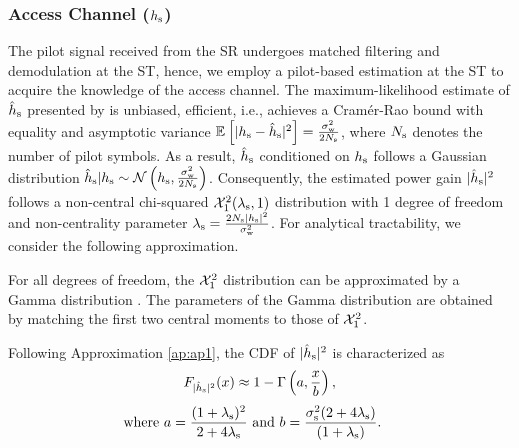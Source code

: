 \subsubsection*{Access Channel ($h_{\text{s}}$)}
The pilot signal received from the SR undergoes matched filtering and demodulation at the ST, hence, we employ a pilot-based estimation at the ST to acquire the knowledge of the access channel. The maximum-likelihood estimate of $\hat{h}_{\text{s}}$ presented by \cite{Gifford08} is unbiased, efficient, i.e., achieves a Cram\'er-Rao bound with equality and asymptotic variance ${\mathbb E}_{}\left[ |h_{\text{s}} -\hat{h}_{\text{s}}|^2 \right] = \frac{\sigma^2_{\text{w}}}{2 N_{\text{s}}}$, where $N_{\text{s}}$ denotes the number of pilot symbols. As a result, $\hat{h}_{\text{s}}$ conditioned on $h_{\text{s}}$ follows a Gaussian distribution
$\hat{h}_{\text{s}}|h_{\text{s}} \sim \mathcal{N}\left( h_{\text{s}},\frac{\sigma^2_{\text{w}}}{2 N_{\text{s}}} \right)$.
Consequently, the estimated power gain $|\hat{h}_{\text{s}}|^2$ follows a non-central chi-squared $\ncchi2(\ls, 1)$ distribution with 1 degree of freedom and non-centrality parameter $\lambda_{\text{s}} = \frac{2 N_{\text{s}} |h_{\text{s}}|^2}{\sigma^2_{\text{w}}}$. For analytical tractability, we consider the following approximation. 
\begin{approxi} \label{ap:ap1}
For all degrees of freedom, the $\ncchi2$ distribution can be approximated by a Gamma distribution \cite{abramo}. The parameters of the Gamma distribution are obtained by matching the first two central moments to those of $\ncchi2$.
\end{approxi}
Following Approximation \ref{ap:ap1}, the CDF of $|\hat{h}_{\text{s}}|^2$ is characterized as
\begin{align}
\fephs(x) \approx 1 - \Gamma \left(a, \frac{x}{b} \right) \label{eq:fephs}, 
\end{align}
\begin{align}
\text{where  } a = \frac{(1 + \ls)^2}{2 + 4 \ls} &\text{ and } b = \frac{\nps (2 + 4 \ls)}{(1 + \ls)}.  \label{eq:para_hs} 
\end{align}

